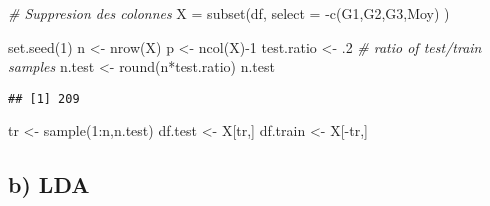 \documentclass[
]{article}
\newenvironment{Shaded}{\begin{snugshade}}{\end{snugshade}}
\newcommand{\AttributeTok}[1]{\textcolor[rgb]{0.77,0.63,0.00}{#1}}
\newcommand{\CommentTok}[1]{\textcolor[rgb]{0.56,0.35,0.01}{\textit{#1}}}
\newcommand{\DecValTok}[1]{\textcolor[rgb]{0.00,0.00,0.81}{#1}}
\newcommand{\FunctionTok}[1]{\textcolor[rgb]{0.00,0.00,0.00}{#1}}
\newcommand{\NormalTok}[1]{#1}
\newcommand{\OtherTok}[1]{\textcolor[rgb]{0.56,0.35,0.01}{#1}}
\newcommand{\SpecialCharTok}[1]{\textcolor[rgb]{0.00,0.00,0.00}{#1}}
\begin{document}
\begin{Shaded}
\begin{Highlighting}[]
\CommentTok{\# Suppresion des colonnes}
\NormalTok{X }\OtherTok{=} \FunctionTok{subset}\NormalTok{(df, }\AttributeTok{select =} \SpecialCharTok{{-}}\FunctionTok{c}\NormalTok{(G1,G2,G3,Moy) )}

\FunctionTok{set.seed}\NormalTok{(}\DecValTok{1}\NormalTok{)}
\NormalTok{n }\OtherTok{\textless{}{-}} \FunctionTok{nrow}\NormalTok{(X)}
\NormalTok{p }\OtherTok{\textless{}{-}} \FunctionTok{ncol}\NormalTok{(X)}\SpecialCharTok{{-}}\DecValTok{1}
\NormalTok{test.ratio }\OtherTok{\textless{}{-}}\NormalTok{ .}\DecValTok{2} \CommentTok{\# ratio of test/train samples}
\NormalTok{n.test }\OtherTok{\textless{}{-}} \FunctionTok{round}\NormalTok{(n}\SpecialCharTok{*}\NormalTok{test.ratio)}
\NormalTok{n.test}
\end{Highlighting}
\end{Shaded}

\begin{verbatim}
## [1] 209
\end{verbatim}

\begin{Shaded}
\begin{Highlighting}[]
\NormalTok{tr }\OtherTok{\textless{}{-}} \FunctionTok{sample}\NormalTok{(}\DecValTok{1}\SpecialCharTok{:}\NormalTok{n,n.test)}
\NormalTok{df.test }\OtherTok{\textless{}{-}}\NormalTok{ X[tr,]}
\NormalTok{df.train }\OtherTok{\textless{}{-}}\NormalTok{ X[}\SpecialCharTok{{-}}\NormalTok{tr,]}
\end{Highlighting}
\end{Shaded}

\hypertarget{b-lda}{%
\subsection{b) LDA}\label{b-lda}}

\begin{Shaded}
\end{Shaded}
\end{document}
